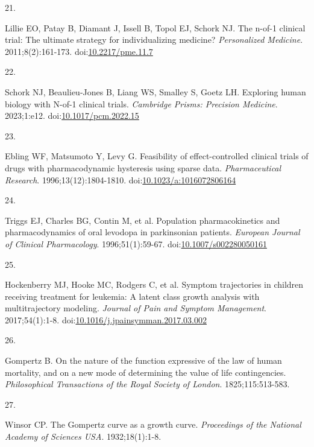 \documentclass[
  11pt,
]{article}
\newlength{\cslhangindent}
\newlength{\csllabelwidth}
\newenvironment{CSLReferences}[2] %
 {\begin{list}{}{%
  \setlength{\itemindent}{0pt}
  \setlength{\leftmargin}{0pt}
  \setlength{\parsep}{0pt}
  \ifodd #1
   \setlength{\leftmargin}{\cslhangindent}
   \setlength{\itemindent}{-1\cslhangindent}
  \fi
  \setlength{\itemsep}{#2\baselineskip}}}
 {\end{list}}
\newcommand{\CSLLeftMargin}[1]{\parbox[t]{\csllabelwidth}{\strut#1\strut}}
\newcommand{\CSLRightInline}[1]{\parbox[t]{\linewidth - \csllabelwidth}{\strut#1\strut}}
\begin{document}
\begin{CSLReferences}{0}{1}
\CSLLeftMargin{21. }%
\CSLRightInline{Lillie EO, Patay B, Diamant J, Issell B, Topol EJ, Schork NJ. The n-of-1 clinical trial: The ultimate strategy for individualizing medicine? \emph{Personalized Medicine}. 2011;8(2):161-173. doi:\href{https://doi.org/10.2217/pme.11.7}{10.2217/pme.11.7}}

\CSLLeftMargin{22. }%
\CSLRightInline{Schork NJ, Beaulieu-Jones B, Liang WS, Smalley S, Goetz LH. Exploring human biology with {N}-of-1 clinical trials. \emph{Cambridge Prisms: Precision Medicine}. 2023;1:e12. doi:\href{https://doi.org/10.1017/pcm.2022.15}{10.1017/pcm.2022.15}}

\CSLLeftMargin{23. }%
\CSLRightInline{Ebling WF, Matsumoto Y, Levy G. Feasibility of effect-controlled clinical trials of drugs with pharmacodynamic hysteresis using sparse data. \emph{Pharmaceutical Research}. 1996;13(12):1804-1810. doi:\href{https://doi.org/10.1023/a:1016072806164}{10.1023/a:1016072806164}}

\CSLLeftMargin{24. }%
\CSLRightInline{{Triggs EJ, Charles BG, Contin M, et al.} Population pharmacokinetics and pharmacodynamics of oral levodopa in parkinsonian patients. \emph{European Journal of Clinical Pharmacology}. 1996;51(1):59-67. doi:\href{https://doi.org/10.1007/s002280050161}{10.1007/s002280050161}}

\CSLLeftMargin{25. }%
\CSLRightInline{{Hockenberry MJ, Hooke MC, Rodgers C, et al.} Symptom trajectories in children receiving treatment for leukemia: A latent class growth analysis with multitrajectory modeling. \emph{Journal of Pain and Symptom Management}. 2017;54(1):1-8. doi:\href{https://doi.org/10.1016/j.jpainsymman.2017.03.002}{10.1016/j.jpainsymman.2017.03.002}}

\CSLLeftMargin{26. }%
\CSLRightInline{Gompertz B. On the nature of the function expressive of the law of human mortality, and on a new mode of determining the value of life contingencies. \emph{Philosophical Transactions of the Royal Society of London}. 1825;115:513-583.}

\CSLLeftMargin{27. }%
\CSLRightInline{Winsor CP. The {G}ompertz curve as a growth curve. \emph{Proceedings of the National Academy of Sciences USA}. 1932;18(1):1-8.}


\end{CSLReferences}
\end{document}
